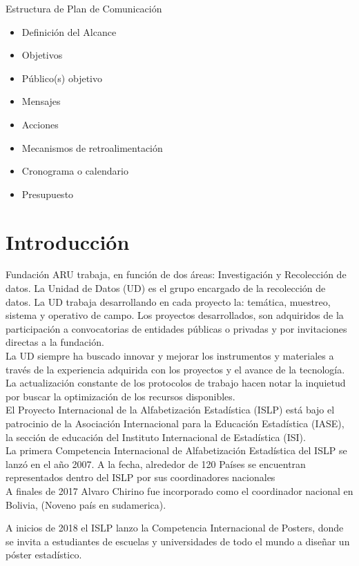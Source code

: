 \documentclass{article}
\begin{document}
Estructura de Plan de Comunicación
\begin{itemize}
\item Definición del Alcance
\item Objetivos
\item Público(s) objetivo
\item Mensajes
\item Acciones
\item Mecanismos de retroalimentación
\item Cronograma o calendario
\item Presupuesto
\end{itemize}

\section{Introducción}

Fundación ARU trabaja, en función de dos áreas: Investigación y Recolección de datos. La Unidad de Datos (UD) es el grupo encargado de la recolección de datos. La UD trabaja desarrollando en cada proyecto la: temática, muestreo, sistema y operativo de campo. Los proyectos desarrollados, son adquiridos de la participación a convocatorias de entidades públicas o privadas y por invitaciones directas a la fundación.\\

La UD siempre ha buscado innovar y mejorar los instrumentos y materiales a través de la experiencia adquirida con los proyectos y el avance de la tecnología. La actualización constante de los protocolos de trabajo hacen notar la inquietud por buscar la optimización de los recursos disponibles.\\                           

El Proyecto Internacional de la Alfabetización Estadística (ISLP) está bajo el patrocinio de la Asociación Internacional para la Educación Estadística (IASE), la sección de educación del Instituto Internacional de Estadística (ISI).\\

La primera Competencia Internacional de Alfabetización Estadística del ISLP se lanzó en el año 2007. A la fecha, alrededor de 120 Países se encuentran representados dentro del ISLP por sus coordinadores nacionales\\

A finales de 2017 Alvaro Chirino fue incorporado como el coordinador nacional en Bolivia, (Noveno país en sudamerica).

A inicios de 2018 el ISLP lanzo la Competencia Internacional de
Posters, donde se invita a estudiantes de escuelas y universidades de todo el mundo a diseñar un póster estadístico.
\end{document}
